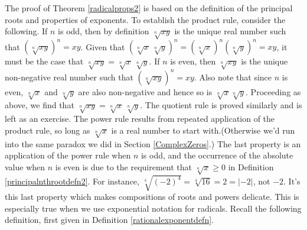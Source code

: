 
\medskip

The proof of Theorem \ref{radicalprops2} is based on the definition of the principal roots and properties of exponents. To establish the product rule, consider the following.  If $n$ is odd, then by definition $\sqrt[n]{xy}$ is the unique real number such that $(\sqrt[n]{xy})^{n} = xy$.  Given that $\left( \sqrt[n]{x} \, \sqrt[n]{y}\right)^n = \left(\sqrt[n]{x}\right)^n \left(\sqrt[n]{y}\right)^n = xy$, it must be the case that $\sqrt[n]{xy} = \sqrt[n]{x} \, \sqrt[n]{y}$. If $n$ is even, then $\sqrt[n]{xy}$ is the unique non-negative real number such that $(\sqrt[n]{xy})^{n} = xy$.  Also note that since $n$ is even, $\sqrt[n]{x}$ and $\sqrt[n]{y}$ are also non-negative and hence so is $\sqrt[n]{x}\sqrt[n]{y}$.  Proceeding as above, we find that $\sqrt[n]{xy} = \sqrt[n]{x} \, \sqrt[n]{y}$.  The quotient rule is proved similarly and is left as an exercise.  The power rule results from repeated application of the product rule, so long as $\sqrt[n]{x}$ is a real number to start with.(Otherwise we'd run into the same paradox we did in Section \ref{ComplexZeros}.)  The last property is an application of the power rule when $n$ is odd, and the occurrence of the absolute value when $n$ is even is due to the requirement that  $\sqrt[n]{x} \geq 0$ in Definition \ref{principalnthrootdefn2}. For instance, $\sqrt[4]{(-2)^4} = \sqrt[4]{16}= 2 =  |-2|$, not $-2$.   It's this last property which makes compositions of roots and powers delicate.  This is especially true when we use exponential notation for radicals.  Recall the following definition, first given in Definition \ref{rationalexponentdefn}.

